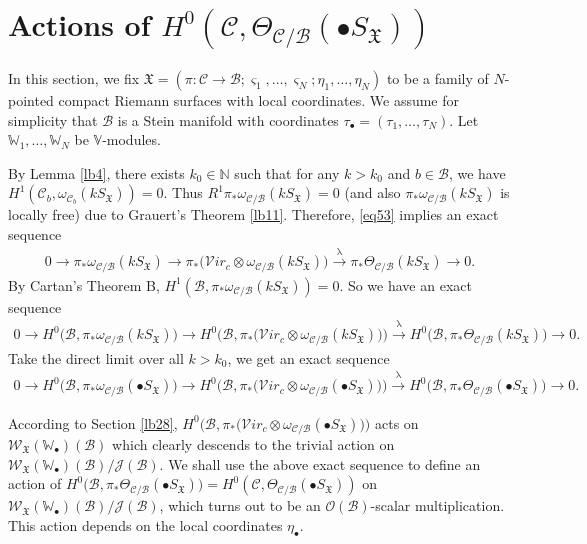 \documentclass[12pt,a4paper,notitlepage]{article}
\theoremstyle{definition}
\theoremstyle{plain}
\newcommand{\fk}{\mathfrak}
\newcommand{\mc}{\mathcal}
\newcommand{\scr}{\mathscr}
\newcommand{\sgm}{\varsigma}
\newcommand{\SX}{S_{\fk X}}
\newcommand{\blt}{\bullet}
\newcommand{\Vbb}{\mathbb V}
\newcommand{\Wbb}{\mathbb W}
\newcommand{\Nbb}{\mathbb N}
\newcommand{\svir}{\mathcal V\!\mathit{ir}}
\numberwithin{equation}{section}
\begin{document}
\section{Actions of $H^0(\mc C,\Theta_{\mc C/\mc B}(\blt\SX))$}\label{lb41}



In this section, we fix  $\fk X=(\pi:\mc C\rightarrow\mc B;\sgm_1,\dots,\sgm_N;\eta_1,\dots,\eta_N)$ to be a family of $N$-pointed compact Riemann surfaces with local coordinates. We assume for simplicity that $\mc B$ is a Stein manifold with coordinates $\tau_\blt=(\tau_1,\dots,\tau_N)$. Let $\Wbb_1,\dots,\Wbb_N$ be $\Vbb$-modules. 

By Lemma \ref{lb4},  there exists $k_0\in\Nbb$ such that for any $k>k_0$ and $b\in \mc B$, we have $H^1(\mc C_b,\omega_{\mc C_b}(kS_{\fk X}))=0$. Thus $R^1\pi_*\omega_{\mc C/\mc B}(kS_{\fk X})=0$ (and also $\pi_*\omega_{\mc C/\mc B}(kS_{\fk X})$ is locally free) due to Grauert's Theorem \ref{lb11}. Therefore, \eqref{eq53} implies an exact sequence
\begin{align*}
0\rightarrow \pi_*\omega_{\mc C/\mc B}(k\SX) \rightarrow \pi_*\big(\svir_c\otimes \omega_{\mc C/\mc B}(k\SX)\big)\xrightarrow{\uplambda}   \pi_*\Theta_{\mc C/\mc B}(k\SX)\rightarrow 0.
\end{align*}
By Cartan's Theorem B, $H^1(\mc B,\pi_*\omega_{\mc C/\mc B}(k\SX))=0$. So we have an exact sequence
\begin{align*}
0\rightarrow H^0\big(\mc B,\pi_*\omega_{\mc C/\mc B}(k\SX)\big) \rightarrow H^0\big(\mc B,\pi_*\big(\svir_c\otimes \omega_{\mc C/\mc B}(k\SX)\big)\big)\xrightarrow{\uplambda}   H^0\big(\mc B,\pi_*\Theta_{\mc C/\mc B}(k\SX)\big)\rightarrow 0.
\end{align*}
Take the direct limit over all $k>k_0$, we get an exact sequence
\begin{align}
0\rightarrow H^0\big(\mc B,\pi_*\omega_{\mc C/\mc B}(\blt\SX)\big) \rightarrow H^0\big(\mc B,\pi_*\big(\svir_c\otimes \omega_{\mc C/\mc B}(\blt\SX)\big)\big)\xrightarrow{\uplambda}   H^0\big(\mc B,\pi_*\Theta_{\mc C/\mc B}(\blt\SX)\big)\rightarrow 0.\label{eq78}
\end{align}



According to Section \ref{lb28}, $H^0\big(\mc B,\pi_*\big(\svir_c\otimes \omega_{\mc C/\mc B}(\blt\SX)\big)\big)$ acts on $\scr W_{\fk X}(\Wbb_\blt)(\mc B)$ which clearly descends to the trivial action on $\scr W_{\fk X}(\Wbb_\blt)(\mc B)/\scr J(\mc B)$. We shall use the above exact sequence to define an action of $H^0\big(\mc B,\pi_*\Theta_{\mc C/\mc B}(\blt\SX)\big)=H^0(\mc C,\Theta_{\mc C/\mc B}(\blt\SX))$ on $\scr W_{\fk X}(\Wbb_\blt)(\mc B)/\scr J(\mc B)$, which turns out to be an $\scr O(\mc B)$-scalar multiplication. This action depends on the local coordinates $\eta_\blt$.
\end{document}
